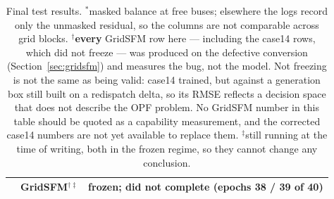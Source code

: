 \documentclass[10pt]{article}
\begin{document}
\begin{table}[H]
\begin{tabular}{llrrrr}
        & GridSFM$^{\dagger\ddagger}$ & \multicolumn{4}{l}{frozen; did not complete (epochs 38 / 39 of 40)} \\
\bottomrule
\end{tabular}
\caption{Final test results.
$^{\ast}$masked balance at free buses; elsewhere the logs record only the
unmasked residual, so the columns are not comparable across grid blocks.
$^{\dagger}$\textbf{every} GridSFM row here --- including the case14 rows, which
did not freeze --- was produced on the defective conversion
(Section~\ref{sec:gridsfm}) and measures the bug, not the model. Not freezing is
not the same as being valid: case14 trained, but against a generation box still
built on a redispatch delta, so its RMSE reflects a decision space that does not
describe the OPF problem. No GridSFM number in this table should be quoted as a
capability measurement, and the corrected case14 numbers are not yet available
to replace them.
$^{\ddagger}$still running at the time of writing, both in the frozen regime, so
they cannot change any conclusion.}
\end{table}
\end{document}
